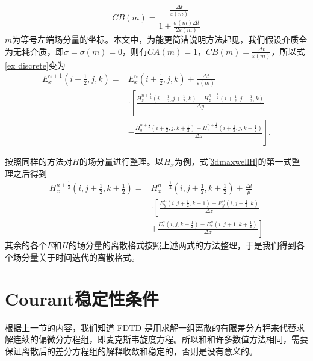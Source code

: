 \begin{equation}
CB(m)=\frac{
	\frac{\Delta t}{\varepsilon(m)}
}{
1+\frac{\sigma(m)\Delta t}{2\varepsilon(m)}	
}	
\end{equation}\label{ex discrete simple}
$m$为等号左端场分量的坐标。本文中，为能更简洁说明方法起见，我们假设介质全为无耗介质，即$\sigma=\sigma(m)=0$，则有$CA(m)=1$，$CB(m)=\frac{\Delta t}{\varepsilon(m)}$，所以式\eqref{ex discrete}变为
\begin{equation}
\begin{split}
E^{n+1}_{x}\left( i+\frac{1}{2},j,k \right)=&E^{n}_{x}\left( i+\frac{1}{2},j,k \right)+\frac{\Delta t}{\varepsilon(m)}\\
{}&\cdot\left[
\frac{H^{n+\frac{1}{2}}_{z}\left(i+\frac{1}{2},j+\frac{1}{2},k\right)-H^{n+\frac{1}{2}}_{z}\left(i+\frac{1}{2},j-\frac{1}{2},k\right)}{\Delta y}\right.\\
{}&-
\left.\frac{H^{n+\frac{1}{2}}_{y}\left(i+\frac{1}{2},j,k+\frac{1}{2}\right)-H^{n+\frac{1}{2}}_{z}\left(i+\frac{1}{2},j,k-\frac{1}{2}\right)}{\Delta z}
\right].
\end{split}
\end{equation}

按照同样的方法对$\mathbf{\mathit{H}}$的场分量进行整理。以$H_x$为例，式\eqref{3dmaxwellH}的第一式整理之后得到
\begin{equation}\label{hx discrete simple}
\begin{split}
H^{n+\frac{1}{2}}_{x}\left( i,j+\frac{1}{2},k+\frac{1}{2} \right)=&H^{n-\frac{1}{2}}_{x}\left( i,j+\frac{1}{2},k+\frac{1}{2} \right)+\frac{\Delta t}{\mu}\\
{}&\cdot\left[
\frac{
	E^n_y\left(i,j+\frac{1}{2},k+1\right)-E^n_y\left(i,j+\frac{1}{2},k\right)
	}{\Delta z}\right.\\
{}&+\left.
\frac{
	E^n_z\left(i,j,k+\frac{1}{2}\right)-E^n_z\left(i,j+1,k+\frac{1}{2}\right)
}{\Delta z}
\right]
\end{split}
\end{equation}
其余的各个$\mathbf{\mathit{E}}$和$\mathbf{\mathit{H}}$的场分量的离散格式按照上述两式的方法整理，于是我们得到各个场分量关于时间迭代的离散格式。

\section{Courant稳定性条件}
根据上一节的内容，我们知道 FDTD 是用求解一组离散的有限差分方程来代替求解连续的偏微分方程组，即麦克斯韦旋度方程。所以和和许多数值方法相同，需要保证离散后的差分方程组的解释收敛和稳定的，否则是没有意义的。

